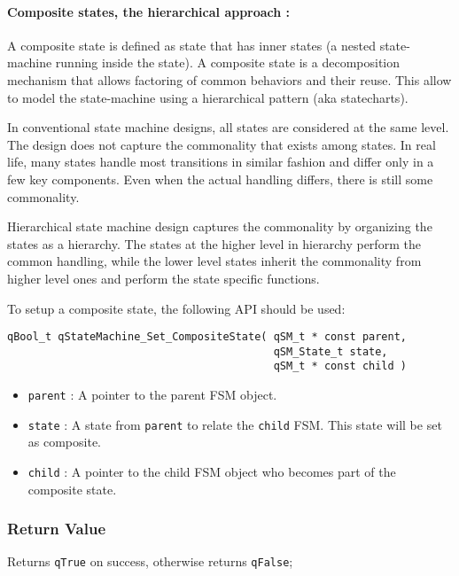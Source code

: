 \paragraph{Composite states, the hierarchical approach : } A composite state is defined as state that has inner states (a nested state-machine running inside the state). A composite state is a decomposition mechanism that allows factoring of common behaviors and their reuse. This allow to model the state-machine using a hierarchical pattern (aka statecharts). 

In conventional state machine designs, all states are considered at the same level. The design does not capture the commonality that exists among states. In real life, many states handle most transitions in similar fashion and differ only in a few key components. Even when the actual handling differs, there is still some commonality.

Hierarchical state machine design captures the commonality by organizing the states as a hierarchy. The states at the higher level in hierarchy perform the common handling, while the lower level states inherit the commonality from higher level ones and perform the state specific functions. 

To setup a composite state, the following API should be used: \\

\begin{lstlisting}[style=CStyle]
qBool_t qStateMachine_Set_CompositeState( qSM_t * const parent, 
                                          qSM_State_t state, 
                                          qSM_t * const child )
\end{lstlisting}

\begin{itemize}
    \item \lstinline{parent} : A pointer to the parent FSM object.
    \item \lstinline{state} : A state from \lstinline{parent} to relate the \lstinline{child} FSM. This state will be set as composite.
    \item \lstinline{child} : A pointer to the child FSM object who becomes part of the composite state.
\end{itemize}

\subsubsection*{Return Value}
Returns \lstinline{qTrue} on success, otherwise returns \lstinline{qFalse};


